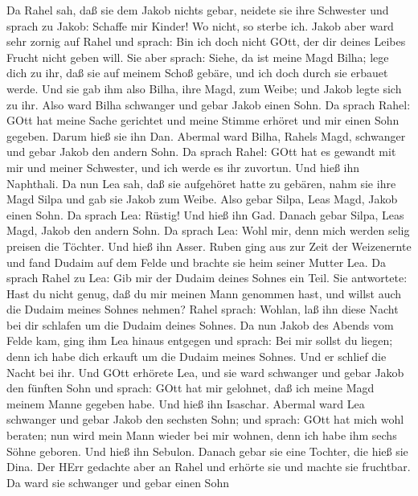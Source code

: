  Da Rahel sah, daß sie dem Jakob nichts gebar, neidete sie
ihre Schwester und sprach zu Jakob: Schaffe mir Kinder! Wo nicht, so
sterbe ich.  Jakob aber ward sehr zornig auf Rahel und
sprach: Bin ich doch nicht GOtt, der dir deines Leibes Frucht nicht
geben will.  Sie aber sprach: Siehe, da ist meine Magd
Bilha; lege dich zu ihr, daß sie auf meinem Schoß gebäre, und ich doch
durch sie erbauet werde.  Und sie gab ihm also Bilha, ihre
Magd, zum Weibe; und Jakob legte sich zu ihr.  Also ward
Bilha schwanger und gebar Jakob einen Sohn.  Da sprach
Rahel: GOtt hat meine Sache gerichtet und meine Stimme erhöret und mir
einen Sohn gegeben. Darum hieß sie ihn Dan.  Abermal ward
Bilha, Rahels Magd, schwanger und gebar Jakob den andern Sohn.
 Da sprach Rahel: GOtt hat es gewandt mit mir und meiner
Schwester, und ich werde es ihr zuvortun. Und hieß ihn Naphthali.
 Da nun Lea sah, daß sie aufgehöret hatte zu gebären, nahm
sie ihre Magd Silpa und gab sie Jakob zum Weibe.  Also
gebar Silpa, Leas Magd, Jakob einen Sohn.  Da sprach Lea:
Rüstig! Und hieß ihn Gad.  Danach gebar Silpa, Leas Magd,
Jakob den andern Sohn.  Da sprach Lea: Wohl mir, denn mich
werden selig preisen die Töchter. Und hieß ihn Asser. 
Ruben ging aus zur Zeit der Weizenernte und fand Dudaim auf dem Felde
und brachte sie heim seiner Mutter Lea. Da sprach Rahel zu Lea: Gib mir
der Dudaim deines Sohnes ein Teil.  Sie antwortete: Hast du
nicht genug, daß du mir meinen Mann genommen hast, und willst auch die
Dudaim meines Sohnes nehmen? Rahel sprach: Wohlan, laß ihn diese Nacht
bei dir schlafen um die Dudaim deines Sohnes.  Da nun Jakob
des Abends vom Felde kam, ging ihm Lea hinaus entgegen und sprach: Bei
mir sollst du liegen; denn ich habe dich erkauft um die Dudaim meines
Sohnes. Und er schlief die Nacht bei ihr.  Und GOtt
erhörete Lea, und sie ward schwanger und gebar Jakob den fünften Sohn
 und sprach: GOtt hat mir gelohnet, daß ich meine Magd
meinem Manne gegeben habe. Und hieß ihn Isaschar.  Abermal
ward Lea schwanger und gebar Jakob den sechsten Sohn;  und
sprach: GOtt hat mich wohl beraten; nun wird mein Mann wieder bei mir
wohnen, denn ich habe ihm sechs Söhne geboren. Und hieß ihn Sebulon.
 Danach gebar sie eine Tochter, die hieß sie Dina.
 Der HErr gedachte aber an Rahel und erhörte sie und machte
sie fruchtbar.  Da ward sie schwanger und gebar einen Sohn
